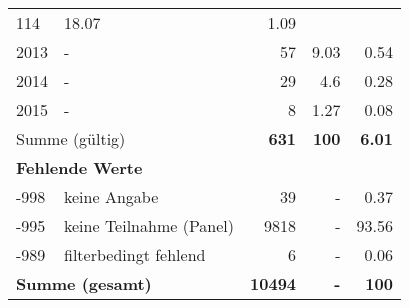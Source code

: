 \begin{longtable}{lXrrr}
       \num{114} &
       \num[round-mode=places,round-precision=2]{18,07} &
         \num[round-mode=places,round-precision=2]{1,09} \\

     2013 &
     \multicolumn{1}{X}{ -  } &


       \num{57} &
       \num[round-mode=places,round-precision=2]{9,03} &
         \num[round-mode=places,round-precision=2]{0,54} \\

     2014 &
     \multicolumn{1}{X}{ -  } &


       \num{29} &
       \num[round-mode=places,round-precision=2]{4,6} &
         \num[round-mode=places,round-precision=2]{0,28} \\

     2015 &
     \multicolumn{1}{X}{ -  } &


       \num{8} &
       \num[round-mode=places,round-precision=2]{1,27} &
         \num[round-mode=places,round-precision=2]{0,08} \\
     \midrule
     \multicolumn{2}{l}{Summe (gültig)} &
       \textbf{\num{631}} &
     \textbf{100} &
       \textbf{\num[round-mode=places,round-precision=2]{6,01}} \\
     \multicolumn{5}{l}{\textbf{Fehlende Werte}}\\
       -998 &
       keine Angabe &
         \num{39} &
        - &
         \num[round-mode=places,round-precision=2]{0,37} \\
       -995 &
       keine Teilnahme (Panel) &
         \num{9818} &
        - &
         \num[round-mode=places,round-precision=2]{93,56} \\
       -989 &
       filterbedingt fehlend &
         \num{6} &
        - &
         \num[round-mode=places,round-precision=2]{0,06} \\
     \midrule
     \multicolumn{2}{l}{\textbf{Summe (gesamt)}} &
          \textbf{\num{10494}} &
        \textbf{-} &
        \textbf{100} \\
     \bottomrule
     \end{longtable}
     
